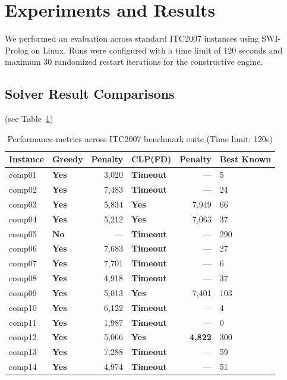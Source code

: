 \documentclass[conference]{IEEEtran}
\begin{document}
\section{Experiments and Results}
We performed an evaluation across standard ITC2007 instances using SWI-Prolog on Linux. Runs were configured with a time limit of 120 seconds and maximum 30 randomized restart iterations for the constructive engine.
\subsection{Solver Result Comparisons}
(see Table~\ref{tab:results})
\begin{table}[htbp]
\centering
\caption{Performance metrics across ITC2007 benchmark suite (Time limit: 120s)}
\label{tab:results}
\begin{tabular}{@{}llrlrl@{}}
\toprule
\textbf{Instance} & \textbf{Greedy} & \textbf{Penalty} & \textbf{CLP(FD)} & \textbf{Penalty} & \textbf{Best Known} \\ \midrule
comp01 & \textbf{Yes}  & 3,020   & \textbf{Timeout}  & ---     & 5     \\
comp02 & \textbf{Yes}  & 7,483   & \textbf{Timeout}  & ---     & 24    \\
comp03 & \textbf{Yes}  & 5,834   & \textbf{Yes}  & 7,949   & 66    \\
comp04 & \textbf{Yes}  & 5,212   & \textbf{Yes}  & 7,063   & 37    \\
comp05 & \textbf{No }  & ---     & \textbf{Timeout}  & ---     & 290   \\
comp06 & \textbf{Yes}  & 7,683   & \textbf{Timeout}  & ---     & 27    \\
comp07 & \textbf{Yes}  & 7,701   & \textbf{Timeout}  & ---     & 6     \\
comp08 & \textbf{Yes}  & 4,918   & \textbf{Timeout}  & ---     & 37    \\
comp09 & \textbf{Yes}  & 5,013   & \textbf{Yes}  & 7,401   & 103   \\
comp10 & \textbf{Yes}  & 6,122   & \textbf{Timeout}  & ---     & 4     \\
comp11 & \textbf{Yes}  & 1,987   & \textbf{Timeout}  & ---     & 0     \\
comp12 & \textbf{Yes}  & 5,066   & \textbf{Yes}  & \textbf{4,822} & 300   \\
comp13 & \textbf{Yes}  & 7,288   & \textbf{Timeout}  & ---     & 59    \\
comp14 & \textbf{Yes}  & 4,974   & \textbf{Timeout}  & ---     & 51    \\

\end{tabular}
\end{table}
\end{document}

